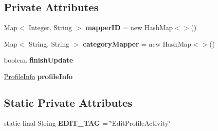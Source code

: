 \subsection*{Private Attributes}
\begin{DoxyCompactItemize}
\item 
Map$<$ Integer, String $>$ {\bfseries mapper\+ID} = new Hash\+Map$<$$>$()\hypertarget{classcom_1_1example_1_1sebastian_1_1tindertp_1_1EditProfileActivity_a188cc80e1bb37a04cdcf81ccc0eab7e5}{}\label{classcom_1_1example_1_1sebastian_1_1tindertp_1_1EditProfileActivity_a188cc80e1bb37a04cdcf81ccc0eab7e5}

\item 
Map$<$ String, String $>$ {\bfseries category\+Mapper} = new Hash\+Map$<$$>$()\hypertarget{classcom_1_1example_1_1sebastian_1_1tindertp_1_1EditProfileActivity_a2d67b2eb88b506597e034d1ba7d939a0}{}\label{classcom_1_1example_1_1sebastian_1_1tindertp_1_1EditProfileActivity_a2d67b2eb88b506597e034d1ba7d939a0}

\item 
boolean {\bfseries finish\+Update}\hypertarget{classcom_1_1example_1_1sebastian_1_1tindertp_1_1EditProfileActivity_aaf2ef6f21f2e91f38537b44d4742b3c0}{}\label{classcom_1_1example_1_1sebastian_1_1tindertp_1_1EditProfileActivity_aaf2ef6f21f2e91f38537b44d4742b3c0}

\item 
\hyperlink{classcom_1_1example_1_1sebastian_1_1tindertp_1_1commonTools_1_1ProfileInfo}{Profile\+Info} {\bfseries profile\+Info}\hypertarget{classcom_1_1example_1_1sebastian_1_1tindertp_1_1EditProfileActivity_a8936a190d1f180c7da5ee55fd736adf1}{}\label{classcom_1_1example_1_1sebastian_1_1tindertp_1_1EditProfileActivity_a8936a190d1f180c7da5ee55fd736adf1}

\end{DoxyCompactItemize}
\subsection*{Static Private Attributes}
\begin{DoxyCompactItemize}
\item 
static final String {\bfseries E\+D\+I\+T\+\_\+\+T\+AG} = \char`\"{}Edit\+Profile\+Activity\char`\"{}\hypertarget{classcom_1_1example_1_1sebastian_1_1tindertp_1_1EditProfileActivity_ab91708d79d228db9f665035ca0aab506}{}\label{classcom_1_1example_1_1sebastian_1_1tindertp_1_1EditProfileActivity_ab91708d79d228db9f665035ca0aab506}

\end{DoxyCompactItemize}


